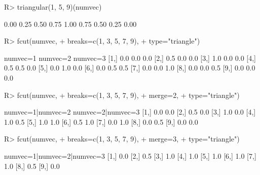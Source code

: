 \documentclass{article}\usepackage[]{graphicx}\usepackage[]{color}
\begin{document}
\begin{Schunk}
% --begin: "fcut.triangular"
\begin{Sinput}
R> triangular(1, 5, 9)(numvec)
\end{Sinput}
\begin{Soutput}
[1] 0.00 0.25 0.50 0.75 1.00 0.75 0.50 0.25 0.00
\end{Soutput}
%
% --end: "fcut.triangular"
\end{Schunk}

\begin{Schunk}
% --begin: "fcut.numeric2"
\begin{Sinput}
R> fcut(numvec,
+       breaks=c(1, 3, 5, 7, 9),
+       type="triangle")
\end{Sinput}
\begin{Soutput}
      numvec=1 numvec=2 numvec=3
 [1,]      0.0      0.0      0.0
 [2,]      0.5      0.0      0.0
 [3,]      1.0      0.0      0.0
 [4,]      0.5      0.5      0.0
 [5,]      0.0      1.0      0.0
 [6,]      0.0      0.5      0.5
 [7,]      0.0      0.0      1.0
 [8,]      0.0      0.0      0.5
 [9,]      0.0      0.0      0.0
\end{Soutput}
%
% --end: "fcut.numeric2"
\end{Schunk}

\begin{Schunk}
% --begin: "fcut.merge"
\begin{Sinput}
R> fcut(numvec,
+       breaks=c(1, 3, 5, 7, 9),
+       merge=2,
+       type="triangle")
\end{Sinput}
\begin{Soutput}
      numvec=1|numvec=2 numvec=2|numvec=3
 [1,]               0.0               0.0
 [2,]               0.5               0.0
 [3,]               1.0               0.0
 [4,]               1.0               0.5
 [5,]               1.0               1.0
 [6,]               0.5               1.0
 [7,]               0.0               1.0
 [8,]               0.0               0.5
 [9,]               0.0               0.0
\end{Soutput}
\begin{Sinput}
R> fcut(numvec,
+       breaks=c(1, 3, 5, 7, 9),
+       merge=3,
+       type="triangle")
\end{Sinput}
\begin{Soutput}
      numvec=1|numvec=2|numvec=3
 [1,]                        0.0
 [2,]                        0.5
 [3,]                        1.0
 [4,]                        1.0
 [5,]                        1.0
 [6,]                        1.0
 [7,]                        1.0
 [8,]                        0.5
 [9,]                        0.0
\end{Soutput}
%
% --end: "fcut.merge"
\end{Schunk}
\end{document}
